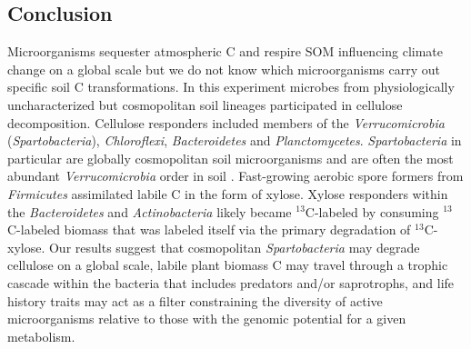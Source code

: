 \subsection{Conclusion} 
Microorganisms sequester atmospheric C and respire SOM influencing climate
change on a global scale but we do not know which microorganisms carry out
specific soil C transformations. In this experiment microbes from
physiologically uncharacterized but cosmopolitan soil lineages participated in
cellulose decomposition. Cellulose responders included members of the
\textit{Verrucomicrobia} (\textit{Spartobacteria}), \textit{Chloroflexi},
\textit{Bacteroidetes} and \textit{Planctomycetes}. \textit{Spartobacteria} in
particular are globally cosmopolitan soil microorganisms and are often the most
abundant \textit{Verrucomicrobia} order in soil \citep{Bergmann_2011}.
Fast-growing aerobic spore formers from \textit{Firmicutes} assimilated labile
C in the form of xylose. Xylose responders within the \textit{Bacteroidetes}
and \textit{Actinobacteria} likely became $^{13}$C-labeled by consuming
$^{13}$C-labeled biomass that was labeled itself via the primary degradation of
$^{13}$C-xylose. Our results suggest that cosmopolitan \textit{Spartobacteria}
may degrade cellulose on a global scale, labile plant biomass C may travel
through a trophic cascade within the bacteria that includes predators and/or
saprotrophs, and life history traits may act as a filter constraining the
diversity of active microorganisms relative to those with the genomic potential
for a given metabolism.
